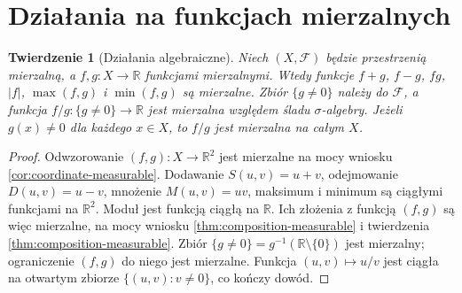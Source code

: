 \documentclass[11pt,a4paper,oneside]{book}
\numberwithin{equation}{chapter}
\theoremstyle{plain}
\newtheorem{twierdzenie}{Twierdzenie}[chapter]
\theoremstyle{definition}
\theoremstyle{remark}
\begin{document}
\section{Działania na funkcjach mierzalnych}

\begin{twierdzenie}[Działania algebraiczne]
\label{thm:measurable-algebra}
Niech $(X,\mathcal F)$ będzie przestrzenią mierzalną,
a $f,g:X\to\mathbb R$ funkcjami mierzalnymi.
Wtedy funkcje $f+g$, $f-g$, $fg$, $|f|$,
$\max(f,g)$ i $\min(f,g)$ są mierzalne.
Zbiór $\{g\ne0\}$ należy do $\mathcal F$, a
funkcja $f/g:\{g\ne0\}\to\mathbb R$ jest mierzalna
względem śladu $\sigma$-algebry. Jeżeli $g(x)\ne0$
dla każdego $x\in X$, to $f/g$ jest mierzalna na całym $X$.
\end{twierdzenie}
\begin{proof}
Odwzorowanie $(f,g):X\to\mathbb R^2$ jest mierzalne
na mocy wniosku \ref{cor:coordinate-measurable}.
Dodawanie $S(u,v)=u+v$, odejmowanie $D(u,v)=u-v$,
mnożenie $M(u,v)=uv$, maksimum i minimum są ciągłymi
funkcjami na $\mathbb R^2$. Moduł jest funkcją ciągłą
na $\mathbb R$. Ich złożenia z funkcją $(f,g)$ są
więc mierzalne, na mocy wniosku \ref{thm:composition-measurable}
i twierdzenia \ref{thm:composition-measurable}.
Zbiór $\{g\ne0\}=g^{-1}(\mathbb R\setminus\{0\})$
jest mierzalny; ograniczenie $(f,g)$ do niego jest
mierzalne. Funkcja $(u,v)\mapsto u/v$ jest ciągła
na otwartym zbiorze $\{(u,v):v\ne0\}$, co kończy dowód.
\end{proof}
\end{document}
